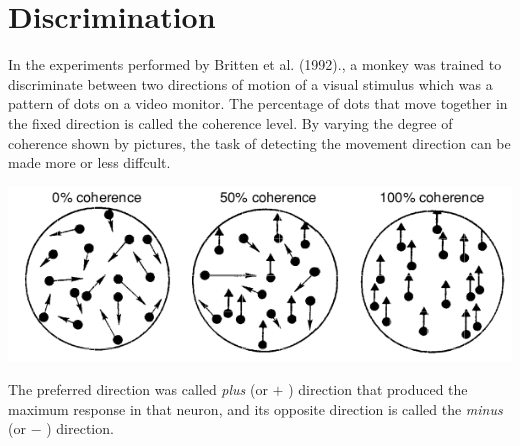 \section{Discrimination}
\label{sec:Single-cell decoding}
\begin{exm}
  \label{exm:mokey experiment}
  In the experiments performed by Britten et al. (1992).,
a monkey was trained to discriminate between two directions of motion
of a visual stimulus which was a pattern of dots on a video monitor. The percentage of dots that move together in the fixed direction is
called the coherence level. By varying the degree of coherence shown by
pictures, the task of detecting the movement direction can be made more or less
diffcult.
\begin{center} 
 \includegraphics[scale = 0.3]{./png/3-1}
\end{center}
\end{exm}
\begin{defn}
  \label{defn:plus and minus}
  The preferred direction was called \emph{plus} (\rm{or} $+$ ) 
direction that produced the maximum response
in that neuron, and  its opposite direction is called the \emph{minus}
 (\rm{or} $-$ ) direction.
\end{defn}
